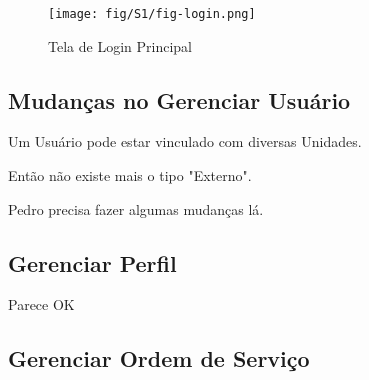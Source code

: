 	
    \begin{figure}[htbp!]
		\centering
		\texttt{[image: fig/S1/fig-login.png]}
		\caption{Tela de Login Principal}
	\label{fig:login}
	\end{figure}


	\subsection{Mudanças no Gerenciar Usuário}	
	
	Um Usuário pode estar vinculado com diversas Unidades.
	
	Então não existe mais o tipo "Externo".
	
	Pedro precisa fazer algumas mudanças lá.


	\subsection{Gerenciar Perfil}	
	
	 Parece OK
	 
	\subsection{Gerenciar Ordem de Serviço}		 
	
